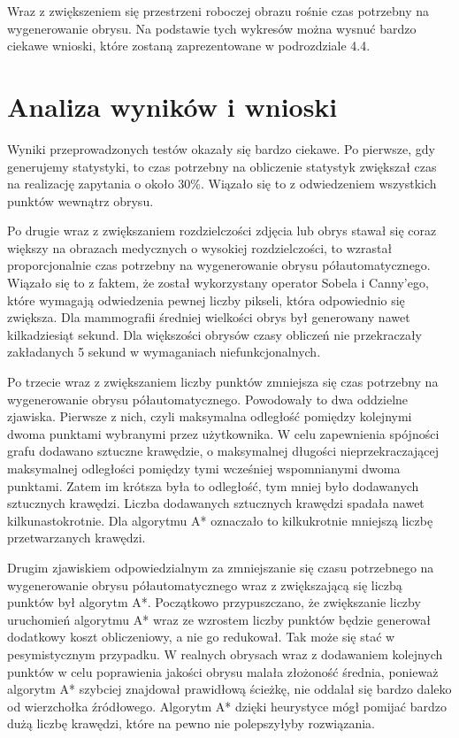 \documentclass[a4paper,11pt,twoside,openright]{report}
\theoremstyle{definition}
\begin{document}
Wraz z zwiększeniem się przestrzeni roboczej obrazu rośnie czas potrzebny na wygenerowanie obrysu. Na podstawie tych wykresów można wysnuć bardzo ciekawe wnioski, które zostaną zaprezentowane w podrozdziale 4.4.

\section {Analiza wyników i wnioski}

Wyniki przeprowadzonych testów okazały się bardzo ciekawe. Po pierwsze, gdy generujemy statystyki, to czas potrzebny na obliczenie statystyk zwiększał czas na realizację zapytania o około 30\%. Wiązało się to z odwiedzeniem wszystkich punktów wewnątrz obrysu.

Po drugie wraz z zwiększaniem rozdzielczości zdjęcia lub obrys stawał się coraz większy na obrazach medycznych o wysokiej rozdzielczości, to wzrastał proporcjonalnie czas potrzebny na wygenerowanie obrysu półautomatycznego. Wiązało się to z faktem, że został wykorzystany operator Sobela i Canny'ego, które wymagają odwiedzenia pewnej liczby pikseli, która odpowiednio się zwiększa. Dla mammografii średniej wielkości obrys był generowany nawet kilkadziesiąt sekund. Dla większości obrysów czasy obliczeń nie przekraczały zakładanych 5 sekund w wymaganiach niefunkcjonalnych.

Po trzecie wraz z zwiększaniem liczby punktów zmniejsza się czas potrzebny na wygenerowanie obrysu półautomatycznego. Powodowały to dwa oddzielne zjawiska. Pierwsze z nich, czyli maksymalna odległość pomiędzy kolejnymi dwoma punktami wybranymi przez użytkownika. W celu zapewnienia spójności grafu dodawano sztuczne krawędzie, o maksymalnej długości nieprzekraczającej maksymalnej odległości pomiędzy tymi wcześniej wspomnianymi dwoma punktami. Zatem im krótsza była to odległość, tym mniej było dodawanych sztucznych krawędzi. Liczba dodawanych sztucznych krawędzi spadała nawet kilkunastokrotnie. Dla algorytmu A* oznaczało to kilkukrotnie mniejszą liczbę przetwarzanych krawędzi.

Drugim zjawiskiem odpowiedzialnym za zmniejszanie się czasu potrzebnego na wygenerowanie obrysu półautomatycznego wraz z zwiększającą się liczbą punktów był algorytm A*. Początkowo przypuszczano, że zwiększanie liczby uruchomień algorytmu A* wraz ze wzrostem liczby punktów będzie generował dodatkowy koszt obliczeniowy, a nie go redukował. Tak może się stać w pesymistycznym przypadku. W realnych obrysach wraz z dodawaniem kolejnych punktów w celu poprawienia jakości obrysu malała złożoność średnia, ponieważ algorytm A* szybciej znajdował prawidłową ścieżkę, nie oddalał się bardzo daleko od wierzchołka źródłowego. Algorytm A* dzięki heurystyce mógł pomijać bardzo dużą liczbę krawędzi, które na pewno nie polepszyłyby rozwiązania.
\end{document}
